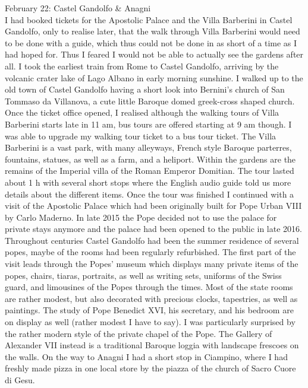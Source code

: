 February 22: Castel Gandolfo \& Anagni\\%
I had booked tickets for the Apostolic Palace and the Villa Barberini in Castel Gandolfo, only to realise later, that the walk through Villa Barberini would need to be done with a guide, which thus could not be done in as short of a time as I had hoped for. Thus I feared I would not be able to actually see the gardens after all. I took the earliest train from Rome to Castel Gandolfo, arriving by the volcanic crater lake of Lago Albano in early morning sunshine. I walked up to the old town of Castel Gandolfo having a short look into Bernini's church of San Tommaso da Villanova, a cute little Baroque domed greek-cross shaped church. Once the ticket office opened, I realised although the walking tours of Villa Barberini starts late in 11 am, bus tours are offered starting at 9 am though. I was able to upgrade my walking tour ticket to a bus tour ticket. The Villa Barberini is a vast park, with many alleyways, French style Baroque parterres, fountains, statues, as well as a farm, and a heliport. Within the gardens are the remains of the Imperial villa of the Roman Emperor Domitian. The tour lasted about 1 h with several short stops where the English audio guide told us more details about the different items. Once the tour was finished I continued with a visit of the Apostolic Palace which had been originally built for Pope Urban VIII by Carlo Maderno. In late 2015 the Pope decided not to use the palace for private stays anymore and the palace had been opened to the public in late 2016. Throughout centuries Castel Gandolfo had been the summer residence of several popes, maybe of the rooms had been regularly refurbished. The first part of the visit leads through the Popes' museum which displays many private items of the popes, chairs, tiaras, portraits, as well as writing sets, uniforms of the Swiss guard, and limousines of the Popes through the times. Most of the state rooms are rather modest, but also decorated with precious clocks, tapestries, as well as paintings. The study of Pope Benedict XVI, his secretary, and his bedroom are on display as well (rather modest I have to say). I was particularly surprised by the rather modern style of the private chapel of the Pope. The Gallery of Alexander VII instead is a traditional Baroque loggia with landscape frescoes on the walls. On the way to Anagni I had a short stop in Ciampino, where I had freshly made pizza in one local store by the piazza of the church of Sacro Cuore di Gesu. \\

